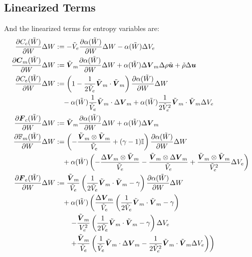 \documentclass[Dissertation.tex]{subfiles}
\begin{document}
\subsection{Linearized Terms}
And the linearized terms for entropy variables are:
\begin{align*}
\frac{\partial C_c(\tilde W)}{\partial W}\Delta W&:=
	-\tilde V_e\frac{\partial\alpha(\tilde W)}{\partial W}\Delta W-\alpha(\tilde W)\Delta V_e
	\\
\frac{\partial\boldsymbol C_m(\tilde W)}{\partial W}\Delta W&:=
	\tilde{\boldsymbol V}_m\frac{\partial\alpha(\tilde W)}{\partial W}\Delta W+\alpha(\tilde W)\Delta\boldsymbol V_m
	\Delta\rho\tilde{\boldsymbol u}+\tilde\rho\Delta\boldsymbol u
	\\
\frac{\partial C_e(\tilde W)}{\partial W}\Delta W&:=
	\left( 1-\frac{1}{2\tilde V_e}\tilde{\boldsymbol V}_m\cdot\tilde{\boldsymbol V}_m \right)\frac{\partial\alpha(\tilde W)}{\partial W}\Delta W
	\\&\quad
	-\alpha(\tilde W)\frac{1}{\tilde V_e}\tilde{\boldsymbol V}_m\cdot\Delta\boldsymbol V_m
	+\alpha(\tilde W)\frac{1}{2\tilde V_e^2}\tilde{\boldsymbol V}_m\cdot\tilde{\boldsymbol V}_m\Delta V_e
	\\
\frac{\partial\boldsymbol F_c(\tilde W)}{\partial W}\Delta W&:=
	\tilde{\boldsymbol V}_m\frac{\partial\alpha(\tilde W)}{\partial W}\Delta W+\alpha(\tilde W)\Delta\boldsymbol V_m
	\\
\frac{\partial\mathbb{F}_m(\tilde W)}{\partial W}\Delta W&:=
	\left( -\frac{\tilde{\boldsymbol V}_m\otimes\tilde{\boldsymbol V}_m}{\tilde V_e}+(\gamma-1)\mathbb{I} \right)\frac{\partial\alpha(\tilde W)}{\partial W}\Delta W
	\\&\quad
	+\alpha(\tilde W)\left( 
	-\frac{\Delta\boldsymbol V_m\otimes\tilde{\boldsymbol V}_m}{\tilde V_e}
	-\frac{\tilde{\boldsymbol V}_m\otimes\Delta\boldsymbol V_m}{\tilde V_e}
	+\frac{\tilde{\boldsymbol V}_m\otimes\tilde{\boldsymbol V}_m}{\tilde V_e^2}\Delta V_e
	 \right)
	\\
\frac{\partial\boldsymbol F_e(\tilde W)}{\partial W}\Delta W&:=
	\frac{\tilde{\boldsymbol V}_m}{\tilde V_e}
	\left( \frac{1}{2\tilde V_e}\tilde{\boldsymbol V}_m\cdot\tilde{\boldsymbol V}_m-\gamma \right)\frac{\partial\alpha(\tilde W)}{\partial W}\Delta W
	\\&\quad
	+\alpha(\tilde W)\left(
	\frac{\Delta\boldsymbol V_m}{\tilde V_e}\left( \frac{1}{2\tilde V_e}\tilde{\boldsymbol V}_m\cdot\tilde{\boldsymbol V}_m-\gamma \right)
	\right.\\&\quad\quad\left.
	-\frac{\tilde{\boldsymbol V}_m}{V_e^2}\left( \frac{1}{2\tilde V_e}\tilde{\boldsymbol V}_m\cdot\tilde{\boldsymbol V}_m-\gamma \right)\Delta V_e
	\right.\\&\quad\quad\left.
	+\frac{\tilde{\boldsymbol V}_m}{\tilde V_e}\left( 
	\frac{1}{\tilde V_e}\tilde{\boldsymbol V}_m\cdot\Delta\boldsymbol V_m
	-\frac{1}{2\tilde V_e^2}\tilde{\boldsymbol V}_m\cdot\tilde{\boldsymbol V}_m\Delta V_e
	 \right)
	\right)
	\\
\end{align*}
\end{document}
